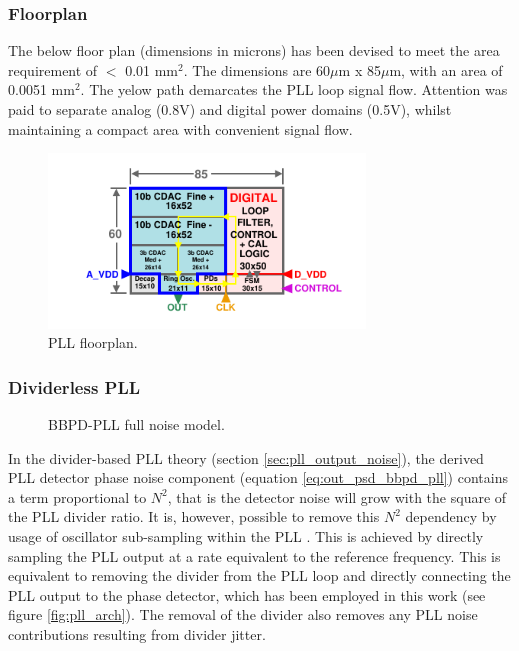 	\subsubsection{Floorplan}
	The below floor plan (dimensions in microns) has been devised to meet the area requirement of $<$ 0.01 mm$^2$. The dimensions are 60$\mu$m x 85$\mu$m, with an area of 0.0051 mm$^2$. The yelow path demarcates the PLL loop signal flow. Attention was paid to separate analog (0.8V) and digital power domains (0.5V), whilst maintaining a compact area with convenient signal flow.
		\begin{figure}[htb!]
	        \centering
	        \includegraphics[width=0.75\textwidth, angle=0]{./figs/design/pll_floorplan3}
		    \caption{PLL floorplan.}
		\end{figure}

\subsubsection{Dividerless PLL}

\begin{figure}[htb!]
	\center
	\caption{BBPD-PLL full noise model.}
	\label{fig:bbpll_full_noise}
\end{figure}

In the divider-based PLL theory (section \ref{sec:pll_output_noise}), the derived PLL detector phase noise component (equation \ref{eq:out_psd_bbpd_pll}) contains a term proportional to $N^2$, that is the detector noise will grow with the square of the PLL divider ratio. It is, however, possible to remove this $N^2$ dependency by usage of oscillator sub-sampling within the PLL \cite{Gao2015}. This is achieved by directly sampling the PLL output at a rate equivalent to the reference frequency. This is equivalent to removing the divider from the PLL loop and directly connecting the PLL output to the phase detector, which has been employed in this work (see figure \ref{fig:pll_arch}). The removal of the divider also removes any PLL noise contributions resulting from divider jitter. 


